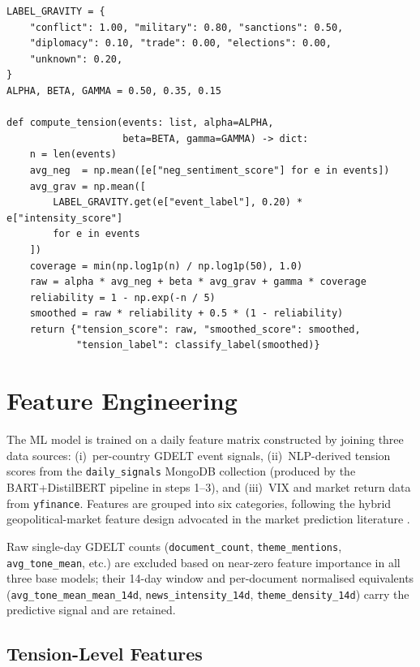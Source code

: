 \documentclass[12pt,a4paper]{report}
\begin{document}
\begin{lstlisting}[caption={Tension score computation for a single
  country-day bucket (simplified from
  \texttt{ml/pipeline/scoring/scorer.py}).},
  label={lst:scorer}]
LABEL_GRAVITY = {
    "conflict": 1.00, "military": 0.80, "sanctions": 0.50,
    "diplomacy": 0.10, "trade": 0.00, "elections": 0.00,
    "unknown": 0.20,
}
ALPHA, BETA, GAMMA = 0.50, 0.35, 0.15

def compute_tension(events: list, alpha=ALPHA,
                    beta=BETA, gamma=GAMMA) -> dict:
    n = len(events)
    avg_neg  = np.mean([e["neg_sentiment_score"] for e in events])
    avg_grav = np.mean([
        LABEL_GRAVITY.get(e["event_label"], 0.20) * e["intensity_score"]
        for e in events
    ])
    coverage = min(np.log1p(n) / np.log1p(50), 1.0)
    raw = alpha * avg_neg + beta * avg_grav + gamma * coverage
    reliability = 1 - np.exp(-n / 5)
    smoothed = raw * reliability + 0.5 * (1 - reliability)
    return {"tension_score": raw, "smoothed_score": smoothed,
            "tension_label": classify_label(smoothed)}
\end{lstlisting}

\section{Feature Engineering}
\label{sec:features}

The ML model is trained on a daily feature matrix constructed by joining
three data sources: (i)~per-country GDELT event signals, (ii)~NLP-derived
tension scores from the \texttt{daily\_signals} MongoDB collection (produced
by the BART+DistilBERT pipeline in steps 1--3), and (iii)~VIX and market
return data from \texttt{yfinance}.  Features are grouped into six
categories, following the hybrid geopolitical-market feature design advocated
in the market prediction literature \cite{nassirtoussi2014, ding2014}.

Raw single-day GDELT counts (\texttt{document\_count}, \texttt{theme\_mentions},
\texttt{avg\_tone\_mean}, etc.) are excluded based on near-zero feature
importance in all three base models; their 14-day window and per-document
normalised equivalents (\texttt{avg\_tone\_mean\_mean\_14d},
\texttt{news\_intensity\_14d}, \texttt{theme\_density\_14d}) carry the
predictive signal and are retained.

\subsection{Tension-Level Features}
\end{document}
